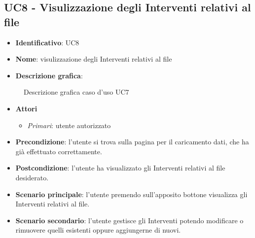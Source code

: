 
\subsection{UC8 - Visulizzazione degli Interventi relativi al file}
\begin{itemize}
  \item \textbf{Identificativo}: UC8
  \item \textbf{Nome}: visulizzazione degli Interventi relativi al file
  \item \textbf{Descrizione grafica}:
\end{itemize}

\begin{figure}[h]
  \centering
  \caption{Descrizione grafica caso d'uso UC7}
\end{figure}

\begin{itemize}
  \item \textbf{Attori}
        \begin{itemize}
          \item \textit{Primari}: utente autorizzato
        \end{itemize}
  \item \textbf{Precondizione}: l'utente si trova sulla pagina per il caricamento dati, che ha già effettuato correttamente.
  \item \textbf{Postcondizione}: l'utente ha visualizzato gli Interventi relativi al file desiderato.
  \item \textbf{Scenario principale}: l'utente premendo sull'apposito bottone visualizza gli Interventi relativi al file.
  \item \textbf{Scenario secondario}: l'utente gestisce gli Interventi potendo modificare o rimuovere quelli esistenti oppure aggiungerne di nuovi.
\end{itemize}

